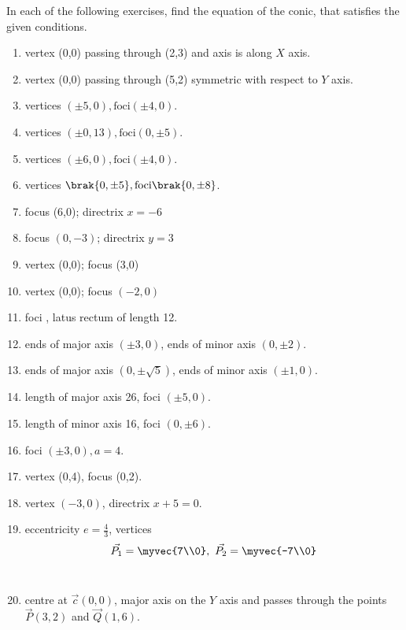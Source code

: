In each of the following exercises, find the equation of the conic, that satisfies the given conditions.

\begin{enumerate}[label=\thesubsection.\arabic*,ref=\thesubsection.\theenumi,resume*]
\item vertex (0,0) passing through (2,3) and axis is along $X$ axis.
\item vertex (0,0) passing through (5,2) symmetric with respect to $Y$ axis.
\item vertices $(\pm5,0),\text{foci} (\pm4,0)$.
\item vertices $(\pm0,13),\text{foci} (0,\pm5)$.
\item vertices $(\pm6,0),\text{foci} (\pm4,0)$.
\item vertices $\brak{0,\pm 5}, \text{foci} \brak{0,\pm 8}$.  
\item focus (6,0); directrix $x=-6$
\item focus $(0,-3)$; directrix $y=3$
\item vertex (0,0); focus (3,0)
\item vertex (0,0); focus $(-2,0) $
\item  foci , latus rectum of length 12.
\\
\solution
		
\item ends of major axis $(\pm3,0)$, ends of minor axis $(0,\pm2)$.
\item ends of major axis $(0,\pm \sqrt{5})$, ends of minor axis $(\pm1,0)$.
\item length of major axis 26, foci $(\pm5,0)$.
\item length of minor axis 16, foci $(0,\pm6)$.
	\\
\solution
		
\item foci $(\pm3,0), a=4$.
\item vertex (0,4),  focus (0,2). 
\item vertex $(-3,0)$,  directrix $x+5=0$.
    \item eccentricity $e = \frac{4}{3}$,
    vertices 
    \begin{align}
        \vec{P_1} = \myvec{7\\0},\ \vec{P_2} = \myvec{-7\\0}
        \label{eq:chapters/11/11/4/14/vert}
    \end{align}
\\
\solution
		
\item centre at $\vec{c}(0,0)$, major axis on the $Y$ axis and passes through the points $\vec{P}(3,2)$ and $\vec{Q}(1,6)$.

\end{enumerate}
